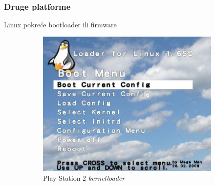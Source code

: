 \documentclass[t]{beamer}
\begin{document}
\begin{frame}
	\frametitle{Druge platforme}
	Linux pokreće bootloader ili firmware
	\begin{figure}
		\centering
		\begin{subfigure}[f]{0.55\textwidth}
			\includegraphics[width=\textwidth]{ps2kernelloader.jpg}
			\caption*{Play Station 2 \emph{kernelloader}}
		\end{subfigure}
		\hfill
		\begin{subfigure}[f]{0.3\textwidth}

\end{subfigure}
\end{figure}
\end{frame}
\end{document}
